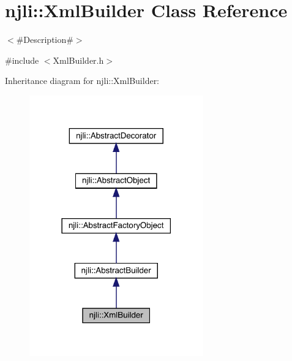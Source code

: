 \hypertarget{classnjli_1_1_xml_builder}{}\section{njli\+:\+:Xml\+Builder Class Reference}
\label{classnjli_1_1_xml_builder}


$<$\#\+Description\#$>$  




{\ttfamily \#include $<$Xml\+Builder.\+h$>$}



Inheritance diagram for njli\+:\+:Xml\+Builder\+:\nopagebreak
\begin{figure}[H]
\begin{center}
\leavevmode
\includegraphics[width=213pt]{classnjli_1_1_xml_builder__inherit__graph}
\end{center}
\end{figure}


